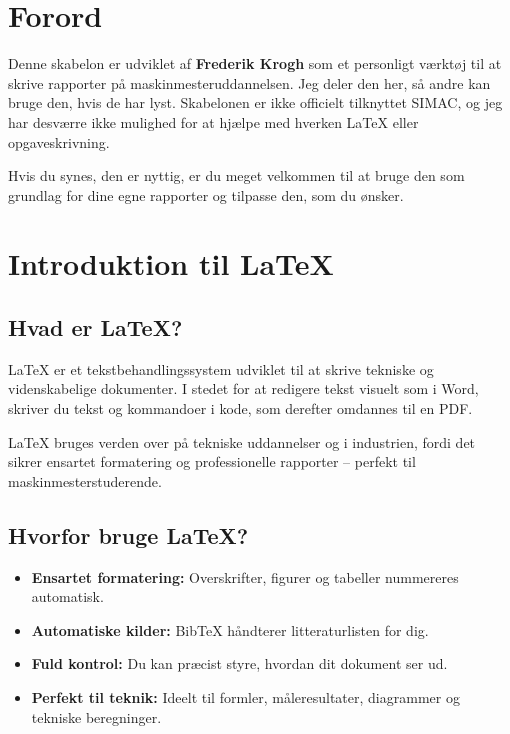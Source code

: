 
\section*{Forord}

Denne skabelon er udviklet af \textbf{Frederik Krogh} som et personligt værktøj til at skrive rapporter på maskinmesteruddannelsen.
Jeg deler den her, så andre kan bruge den, hvis de har lyst. Skabelonen er ikke officielt tilknyttet SIMAC, og jeg har desværre ikke mulighed for at hjælpe med hverken LaTeX eller opgaveskrivning.

Hvis du synes, den er nyttig, er du meget velkommen til at bruge den som grundlag for dine egne rapporter og tilpasse den, som du ønsker.

\newpage

\section{Introduktion til LaTeX}

\subsection{Hvad er LaTeX?}
LaTeX er et tekstbehandlingssystem udviklet til at skrive tekniske og videnskabelige dokumenter.
I stedet for at redigere tekst visuelt som i Word, skriver du tekst og kommandoer i kode, som derefter omdannes til en PDF.

LaTeX bruges verden over på tekniske uddannelser og i industrien, fordi det sikrer ensartet formatering og professionelle rapporter – perfekt til maskinmesterstuderende.

\subsection{Hvorfor bruge LaTeX?}
\begin{itemize}
  \item \textbf{Ensartet formatering:} Overskrifter, figurer og tabeller nummereres automatisk.
  \item \textbf{Automatiske kilder:} BibTeX håndterer litteraturlisten for dig.
  \item \textbf{Fuld kontrol:} Du kan præcist styre, hvordan dit dokument ser ud.
  \item \textbf{Perfekt til teknik:} Ideelt til formler, måleresultater, diagrammer og tekniske beregninger.
\end{itemize}


